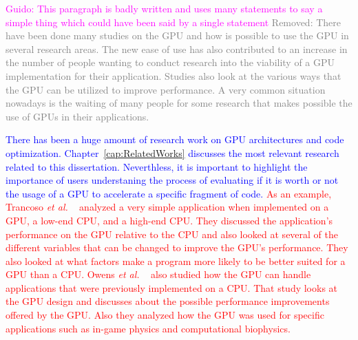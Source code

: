 \documentclass[Ingles]{ic-tese-v1}
\newcommand{\guido}[1]{\noindent\textcolor{magenta}{Guido: {#1}}}
\newcommand{\rem}[1]{\noindent\textcolor{gray}{Removed: {#1}}}
\newcommand{\new}[1]{\noindent\textcolor{blue}{ {#1}}}
\newcommand{\ed}[1]{\noindent\textcolor{red}{ {#1}}}
\newcommand{\guido}[1]{}
\newcommand{\rem}[1]{}
\newcommand{\new}[1]{#1}
\newcommand{\ed}[1]{}
\newcommand{\etal}{{\em et al. }}
\newcommand{\rcap}[1]{Chapter~\ref{cap:#1}}
\begin{document}
\guido{This paragraph is badly written and uses many statements to say a simple thing
which could have been said by a single statement}
\rem{
There have been done many studies on the GPU and how is possible to use the GPU
in several research areas. The new ease of use has also contributed to an
increase in the number of people wanting to conduct research into the viability
of a GPU implementation for their application. Studies also look at the various
ways that the GPU can be utilized to improve performance. A very common
situation nowadays is the waiting of many people for some research that makes
possible the use of GPUs in their applications.}

\new{There has been a huge amount of research work on GPU architectures and code  
optimization. \rcap{RelatedWorks} discusses the most relevant  research related to this 
dissertation. Neverthless, it is important to highlight the importance of users understaning 
the process of evaluating  if it is worth or not the usage of a GPU to accelerate a specific  
fragment of code.}
\ed{As an example, Trancoso \etal~\cite{Trancoso2005} analyzed a very simple
application when implemented on a GPU, a low-end CPU, and a high-end CPU. They
discussed the application’s performance on the GPU relative to the CPU and also
looked at several of the different variables that can be changed to improve the
GPU’s performance. They also looked at what factors make a program more likely
to be better suited for a GPU than a CPU. Owens
\etal~\cite{Owens2008} also studied how the GPU can handle applications that
were previously implemented on a CPU. That study looks at the GPU design and
discusses about the possible performance improvements offered by the GPU. Also
they analyzed how the GPU was used for specific applications such as in-game
physics and computational biophysics.}
\end{document}

